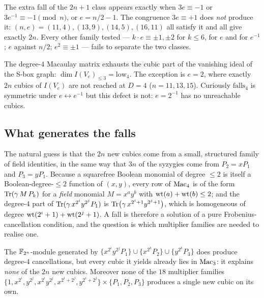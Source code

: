 \begin{observation}\label{obs:sign}
The extra fall of the $2n+1$ class appears exactly when $3e\equiv-1$ or $3e^{-1}\equiv-1 \pmod n$, or
$e=n/2-1$. The congruence $3e\equiv+1$ does \emph{not} produce it: $(n,e)=(11,4),(13,9),(14,5),(16,11)$
all satisfy it and all give exactly $2n$. Every other family tested --- $k\cdot e\equiv\pm1,\pm2$ for
$k\le6$, for $e$ and for $e^{-1}$; $e$ against $n/2$; $e^2\equiv\pm1$ --- fails to separate the two
classes.
\end{observation}

\begin{theorem}\label{thm:outside}
 The degree-$4$ Macaulay matrix exhausts the
cubic part of the vanishing ideal of the S-box graph: $\dim I(V_e)_{\le3}=\mathrm{low}_4$. The
exception is $e=2$, where exactly $2n$ cubics of $I(V_e)$ are not reached at $D=4$ ($n=11,13,15$).
Curiously $\mathrm{falls}_4$ is symmetric under $e\leftrightarrow e^{-1}$ but this defect is not:
$e=2^{-1}$ has no unreachable cubics. \Open
\end{theorem}

\subsection{What generates the falls}

The natural guess is that the $2n$ new cubics come from a small, structured family of field
identities, in the same way that $3n$ of the syzygies come from $P_2=xP_1$ and $P_3=yP_1$. Because a
squarefree Boolean monomial of degree $\le2$ is itself a Boolean-degree-$\le2$ function of $(x,y)$,
every row of $\mathrm{Mac}_4$ is of the form $\operatorname{Tr}(\gamma\,M\,P_k)$ for a \emph{field} monomial $M=x^ay^b$ with
$\operatorname{wt}(a)+\operatorname{wt}(b)\le2$; and the degree-$4$ part of $\operatorname{Tr}(\gamma\,x^{2^i}y^{2^j}P_1)$ is
$\operatorname{Tr}\bigl(\gamma\,x^{2^i+1}y^{2^j+1}\bigr)$, which is homogeneous of degree $\operatorname{wt}(2^i+1)+\operatorname{wt}(2^j+1)$.
A fall is therefore a solution of a pure Frobenius-cancellation condition, and the question is which
multiplier families are needed to realise one.

\begin{observation}\label{obs:ansatz}
 The $\mathbb{F}_{2^n}$-module generated by
$\{x^{2^i}y^{2^j}P_1\}\cup\{x^{2^k}P_2\}\cup\{y^{2^k}P_3\}$ does produce degree-$4$ cancellations,
but every cubic it yields already lies in $\mathrm{Mac}_3$: it explains \emph{none} of the $2n$ new cubics.
Moreover none of the $18$ multiplier families
$\{1,x^{2^i},y^{2^j},x^{2^i}y^{2^j},x^{2^i+2^j},y^{2^i+2^j}\}\times\{P_1,P_2,P_3\}$ produces a single
new cubic on its own.
\end{observation}

